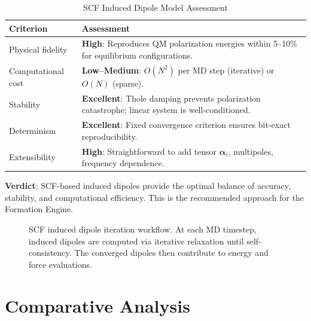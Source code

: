 \documentclass[11pt,letterpaper]{article}
\newcommand{\valpha}{\boldsymbol{\alpha}}
\begin{document}
\begin{table}[h]
\centering
\caption{SCF Induced Dipole Model Assessment}
\label{tab:scf}
\begin{tabular}{@{}lp{10cm}@{}}
\toprule
\textbf{Criterion} & \textbf{Assessment} \\
\midrule
Physical fidelity & \textbf{High}: Reproduces QM polarization energies within 5--10\% for equilibrium configurations. \\
Computational cost & \textbf{Low--Medium}: $O(N^2)$ per MD step (iterative) or $O(N)$ (sparse). \\
Stability & \textbf{Excellent}: Thole damping prevents polarization catastrophe; linear system is well-conditioned. \\
Determinism & \textbf{Excellent}: Fixed convergence criterion ensures bit-exact reproducibility. \\
Extensibility & \textbf{High}: Straightforward to add tensor $\valpha_i$, multipoles, frequency dependence. \\
\bottomrule
\end{tabular}
\end{table}

\textbf{Verdict}: SCF-based induced dipoles provide the optimal balance of accuracy, stability, and computational efficiency. This is the recommended approach for the Formation Engine.

\begin{figure}[h]
\centering
{}
\caption{SCF induced dipole iteration workflow. At each MD timestep, induced dipoles are computed via iterative relaxation until self-consistency. The converged dipoles then contribute to energy and force evaluations.}
\label{fig:scf}
\end{figure}

\section{Comparative Analysis}
\label{sec:comparison}
\end{document}

